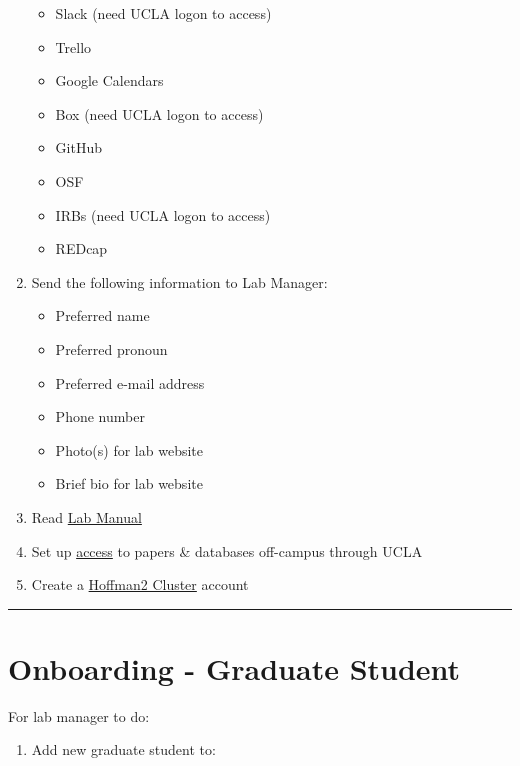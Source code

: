 \documentclass[]{book}
\providecommand{\tightlist}{%
  \setlength{\itemsep}{0pt}\setlength{\parskip}{0pt}}
\begin{document}
\begin{enumerate}
  \begin{itemize}
  \tightlist
  \item
    Slack (need UCLA logon to access)
  \item
    Trello
  \item
    Google Calendars
  \item
    Box (need UCLA logon to access)
  \item
    GitHub
  \item
    OSF
  \item
    IRBs (need UCLA logon to access)
  \item
    REDcap
  \end{itemize}
\item
  Send the following information to Lab Manager:

  \begin{itemize}
  \tightlist
  \item
    Preferred name
  \item
    Preferred pronoun
  \item
    Preferred e-mail address
  \item
    Phone number
  \item
    Photo(s) for lab website
  \item
    Brief bio for lab website
  \end{itemize}
\item
  Read \href{https://bab-lab.github.io/lab_manual/}{Lab Manual}
\item
  Set up
  \href{https://www.library.ucla.edu/use/computers-computing-services/connect-campus}{access}
  to papers \& databases off-campus through UCLA
\item
  Create a \href{https://www.hoffman2.idre.ucla.edu/}{Hoffman2 Cluster}
  account
\end{enumerate}

\begin{center}\rule{0.5\linewidth}{0.5pt}\end{center}

\section{Onboarding - Graduate
Student}\label{onboarding---graduate-student}

For lab manager to do:

\begin{enumerate}
\def\labelenumi{\arabic{enumi}.}
\tightlist
\item
  Add new graduate student to:
\end{enumerate}
\end{document}
